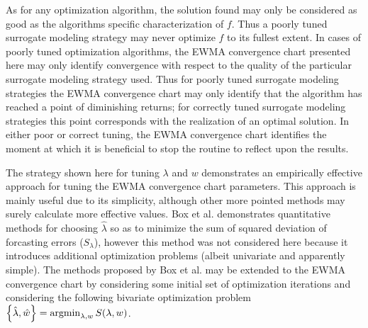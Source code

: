 \documentclass[12pt]{article}
\newcommand{\argmin}{\operatornamewithlimits{argmin}}
\begin{document}
As for any optimization algorithm, the solution found may only be considered as good as the algorithms specific characterization of $f$.
%
Thus a poorly tuned surrogate modeling strategy may never optimize $f$ to its fullest extent.
%
In cases of poorly tuned optimization algorithms, the EWMA convergence chart presented here may only identify convergence with respect to the quality of the particular surrogate modeling strategy used.
Thus for poorly tuned surrogate modeling strategies the EWMA convergence chart may only identify that the algorithm has reached a point of diminishing returns; for correctly tuned surrogate modeling strategies this point corresponds with the realization of an optimal solution.
%
In either poor or correct tuning, the EWMA convergence chart identifies the moment at which it is beneficial to stop the routine to reflect upon the results.
%

%
%

The strategy shown here for tuning $\lambda$ and $w$ demonstrates an empirically effective approach for tuning the EWMA convergence chart parameters. 
%
This approach is mainly useful due to its simplicity, although other more pointed methods may surely calculate more effective values.
%
Box et al. \cite{boxBook} demonstrates quantitative methods for choosing $\hat\lambda$ so as to minimize the sum of squared deviation of forcasting errors ($S_\lambda$), however this method was not considered here because it introduces additional optimization problems (albeit univariate and apparently simple).
%
The methods proposed by Box et al. may be extended to the EWMA convergence chart by considering some initial set of optimization iterations and considering the following bivariate optimization problem \mbox{$\left\{\hat\lambda, \hat w \right\} = \argmin_{\lambda, w} S(\lambda, w)$.} 

\clearpage
%
%
\end{document}
